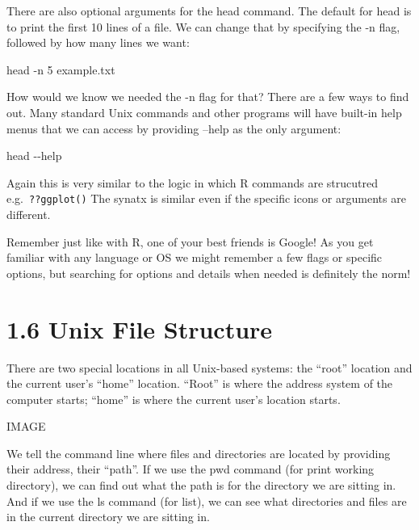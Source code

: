 \documentclass[
]{book}
\newenvironment{Shaded}{\begin{snugshade}}{\end{snugshade}}
\newcommand{\AttributeTok}[1]{\textcolor[rgb]{0.77,0.63,0.00}{#1}}
\newcommand{\FunctionTok}[1]{\textcolor[rgb]{0.00,0.00,0.00}{#1}}
\newcommand{\NormalTok}[1]{#1}
\begin{document}
There are also optional arguments for the head command. The default for head is to print the first 10 lines of a file. We can change that by specifying the -n flag, followed by how many lines we want:

\begin{Shaded}
\begin{Highlighting}[]
    \FunctionTok{head} \AttributeTok{{-}n}\NormalTok{ 5 example.txt}
\end{Highlighting}
\end{Shaded}

How would we know we needed the -n flag for that? There are a few ways to find out. Many standard Unix commands and other programs will have built-in help menus that we can access by providing --help as the only argument:

\begin{Shaded}
\begin{Highlighting}[]
    \FunctionTok{head} \AttributeTok{{-}{-}help}
\end{Highlighting}
\end{Shaded}

Again this is very similar to the logic in which R commands are strucutred e.g.~\texttt{??ggplot()} The synatx is similar even if the specific icons or arguments are different.

Remember just like with R, one of your best friends is Google! As you get familiar with any language or OS we might remember a few flags or specific options, but searching for options and details when needed is definitely the norm!

\hypertarget{unix-file-structure}{%
\section{1.6 Unix File Structure}\label{unix-file-structure}}

There are two special locations in all Unix-based systems: the ``root'' location and the current user's ``home'' location. ``Root'' is where the address system of the computer starts; ``home'' is where the current user's location starts.

IMAGE

We tell the command line where files and directories are located by providing their address, their ``path''. If we use the pwd command (for print working directory), we can find out what the path is for the directory we are sitting in. And if we use the ls command (for list), we can see what directories and files are in the current directory we are sitting in.
\end{document}
